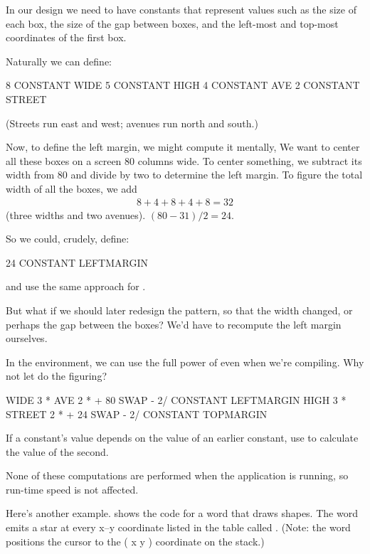 In our design we need to have constants that represent values such as
the size of each box, the size of the gap between boxes, and the
left-most and top-most coordinates of the first box.

Naturally we can define:

\begin{Code}
8 CONSTANT WIDE
5 CONSTANT HIGH
4 CONSTANT AVE
2 CONSTANT STREET
\end{Code}
(Streets run east and west; avenues run north and south.)

Now, to define the left margin, we might compute it mentally, We want
to center all these boxes on a screen 80 columns wide. To center
something, we subtract its width from 80 and divide by two to
determine the left margin. To figure the total width of all the boxes,
we add
\begin{eqnarray}
8 + 4 + 8 + 4 + 8 = 32\nonumber
\end{eqnarray}
(three widths and two avenues). $(80-31) / 2 = 24$.

\goodbreak
So we could, crudely, define:

\begin{Code}
24 CONSTANT LEFTMARGIN
\end{Code}
and use the same approach for .

But what if we should later redesign the pattern, so that the width
changed, or perhaps the gap between the boxes? We'd have to recompute
the left margin ourselves.

In the \Forth{} environment, we can use the full power of \Forth{}
even when we're compiling. Why not let \Forth{} do the figuring?

\begin{Code}
WIDE 3 *  AVE 2 *  +  80 SWAP -  2/ CONSTANT LEFTMARGIN
HIGH 3 *  STREET 2 * +  24 SWAP -  2/ CONSTANT TOPMARGIN
\end{Code}

\begin{tip}
If a constant's value depends on the value of an earlier constant, use
\Forth{} to calculate the value of the second.
\end{tip}
None of these computations are performed when the application is
running, so run-time speed is not affected.

Here's another example.  shows the code for a word that
draws shapes. The word  emits a star at every x--y
coordinate listed in the table called . (Note: the word
 positions the cursor to the ( x y ) coordinate on the
stack.)

